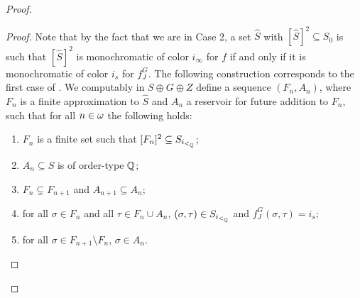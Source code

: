 \begin{proof}
\begin{proof}
    Note that by the fact that we are in Case 2, a set $\hat S$ with $[\hat S]^2\subseteq S_0$ is such that $[\hat S]^2$ is monochromatic of color $i_\infty$ for $f$ if and only if it is monochromatic of color $i_s$ for $f_J^G$. The following construction corresponds to the first case of . We computably in $S\oplus G\oplus Z$ define a sequence $(F_n, A_n)$, where $F_n$ is a finite approximation to $\hat S$ and $A_n$ a reservoir for future addition to $F_n$, such that for all $n\in\omega$ the following holds:
    \begin{enumerate}
    \item $F_n$ is a finite set such that $[F_n]^2\subseteq S_{i_{<_{\mathbb{Q}}}}$;
    \item $A_n\subseteq S$ is of order-type $\mathbb{Q}$;
    \item $F_n\subsetneq F_{n+1}$ and $A_{n+1}\subseteq A_n$;
    \item for all $\sigma\in F_n$ and all $\tau\in F_n\cup A_n$, $(\sigma,\tau)\in S_{i_{<_{\mathbb{Q}}}}$ and $f_J^G(\sigma,\tau)=i_s$;
    \item for all $\sigma\in F_{n+1}\setminus F_n$, $\sigma\in A_n$.



\end{enumerate}
\end{proof}
\end{proof}

